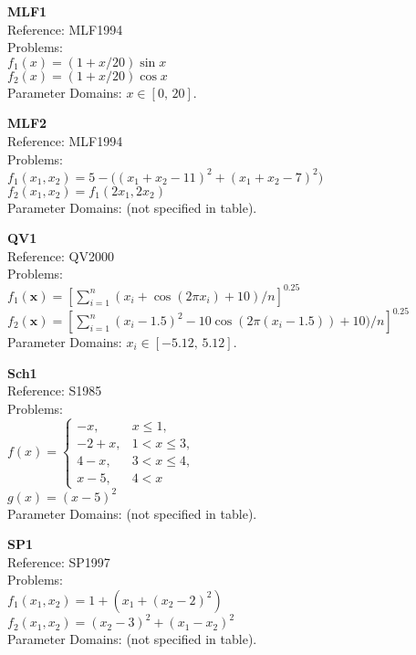 \documentclass[12pt,a4paper]{article}
\begin{document}
\textbf{MLF1}\\
Reference: MLF1994\\
Problems:\\
$f_1(x) = (1 + x/20)\sin x$\\
$f_2(x) = (1 + x/20)\cos x$\\
Parameter Domains: $x \in [0,\,20]$.

\medskip

\textbf{MLF2}\\
Reference: MLF1994\\
Problems:\\
 $f_1(x_1, x_2) = 5 - \big((x_1 + x_2 - 11)^2 + (x_1 + x_2 - 7)^2\big)$\\
 $f_2(x_1, x_2) = f_1(2x_1, 2x_2)$\\
Parameter Domains: (not specified in table).

\medskip

\textbf{QV1}\\
Reference: QV2000\\
Problems:\\
$f_1(\mathbf{x}) = \left[\sum_{i=1}^{n} (x_i + \cos(2\pi x_i) + 10)/n\right]^{0.25}$\\
$f_2(\mathbf{x}) = \left[\sum_{i=1}^{n} (x_i - 1.5)^2 - 10\cos(2\pi(x_i-1.5)) + 10)/n\right]^{0.25}$\\
Parameter Domains: $x_i \in [-5.12,\,5.12]$.

\medskip

\textbf{Sch1}\\
Reference: S1985\\
Problems:\\
$f(x) = \begin{cases}
-x, & x \le 1,\\
-2 + x, & 1 < x \le 3,\\
4 - x, & 3 < x \le 4,\\
x - 5, & 4 < x
\end{cases}$\\
$g(x) = (x-5)^2$\\
Parameter Domains: (not specified in table).

\medskip

\textbf{SP1}\\
Reference: SP1997\\
Problems:\\
$f_1(x_1,x_2) = 1 + (x_1 + (x_2-2)^2)$\\
$f_2(x_1,x_2) = (x_2-3)^2 + (x_1 - x_2)^2$\\
Parameter Domains: (not specified in table).
\end{document}

